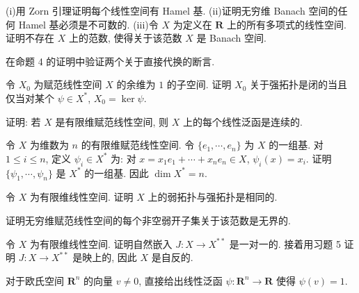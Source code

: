 \documentclass[../../main.tex]{subfiles}
\begin{document}
\begin{exercise}\label{exercise:ch14-01}
(i)用 Zorn 引理证明每个线性空间有 Hamel 基.
(ii)证明无穷维 Banach 空间的任何 Hamel 基必须是不可数的.
(iii)令 $X$ 为定义在 $\mathbf{R}$ 上的所有多项式的线性空间. 证明不存在 $X$ 上的范数, 使得关于该范数 $X$ 是 Banach 空间.
\end{exercise}

\begin{exercise}\label{exercise:ch14-02}
在命题 4 的证明中验证两个关于直接代换的断言.
\end{exercise}

\begin{exercise}\label{exercise:ch14-03}
令 $X_{0}$ 为赋范线性空间 $X$ 的余维为 $1$ 的子空间. 证明 $X_{0}$ 关于强拓扑是闭的当且仅当对某个 $\psi\in X^{*}$, $X_{0}=\ker\psi$.
\end{exercise}

\begin{exercise}\label{exercise:ch14-04}
证明: 若 $X$ 是有限维赋范线性空间, 则 $X$ 上的每个线性泛函是连续的.
\end{exercise}

\begin{exercise}\label{exercise:ch14-05}
令 $X$ 为维数为 $n$ 的有限维赋范线性空间. 令 $\{e_{1},\cdots,e_{n}\}$ 为 $X$ 的一组基. 对 $1\leqslant i\leqslant n$, 定义 $\psi_{i}\in X^{*}$ 为: 对 $x=x_{1}e_{1}+\cdots+x_{n}e_{n}\in X$, $\psi_{i}(x)=x_{i}$. 证明 $\{\psi_{1},\cdots,\psi_{n}\}$ 是 $X^{*}$ 的一组基. 因此 $\dim X^{*}=n$.
\end{exercise}

\begin{exercise}\label{exercise:ch14-06}
令 $X$ 为有限维线性空间. 证明 $X$ 上的弱拓扑与强拓扑是相同的.
\end{exercise}

\begin{exercise}\label{exercise:ch14-07}
证明无穷维赋范线性空间的每个非空弱开子集关于该范数是无界的.
\end{exercise}

\begin{exercise}\label{exercise:ch14-08}
令 $X$ 为有限维线性空间. 证明自然嵌入 $J:X\to X^{**}$ 是一对一的. 接着用习题 5 证明 $J:X\to X^{**}$ 是映上的, 因此 $X$ 是自反的.
\end{exercise}

\begin{exercise}\label{exercise:ch14-09}
对于欧氏空间 $\mathbf{R}^{n}$ 的向量 $v\neq 0$, 直接给出线性泛函 $\psi:\mathbf{R}^{n}\to\mathbf{R}$ 使得 $\psi(v)=1$.
\end{exercise}
\end{document}
